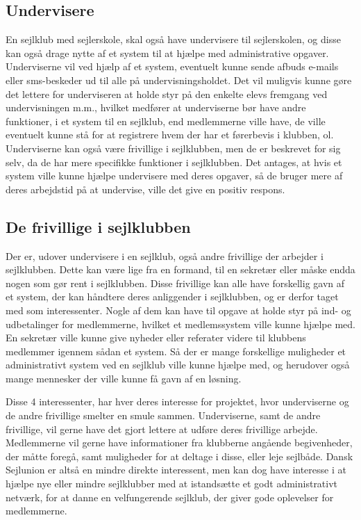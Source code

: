 \subsection{Undervisere}

En sejlklub med sejlerskole, skal også have undervisere til sejlerskolen, og disse kan også drage nytte af et system til
at hjælpe med administrative opgaver. Underviserne vil ved hjælp af et system, eventuelt kunne sende afbuds e-mails eller sms-beskeder ud til alle på
undervisningsholdet. Det vil muligvis kunne gøre det lettere for underviseren at holde styr på den enkelte elevs fremgang
ved undervisningen m.m., hvilket medfører at underviserne bør have andre funktioner, i et system til en sejlklub, end medlemmerne
ville have, de ville eventuelt kunne stå for at registrere hvem der har et førerbevis i klubben, ol. Underviserne kan også
være frivillige i sejlklubben, men de er beskrevet for sig selv, da de har mere specifikke funktioner i sejlklubben. 
Det antages, at hvis et system ville kunne hjælpe undervisere med deres opgaver, så de bruger mere af deres arbejdstid på
at undervise, ville det give en positiv respons.

\subsection{De frivillige i sejlklubben}

Der er, udover undervisere i en sejlklub, også andre frivillige der arbejder i sejlklubben. Dette kan være lige fra en
formand, til en sekretær eller måske endda nogen som gør rent i sejlklubben. Disse frivillige kan alle have forskellig
gavn af et system, der kan håndtere deres anliggender i sejlklubben, og er derfor taget med som interessenter. Nogle af
dem kan have til opgave at holde styr på ind- og udbetalinger for medlemmerne, hvilket et medlemssystem ville kunne
hjælpe med. En sekretær ville kunne give nyheder eller referater videre til klubbens medlemmer igennem sådan et
system. Så der er mange forskellige muligheder et administrativt system ved en sejlklub ville kunne hjælpe med, og
herudover også mange mennesker der ville kunne få gavn af en løsning.


Disse 4 interessenter, har hver deres interesse for projektet, hvor underviserne og de andre frivillige smelter en smule
sammen. Underviserne, samt de andre frivillige, vil gerne have det gjort lettere at udføre deres frivillige arbejde.
Medlemmerne vil gerne have informationer fra klubberne angående begivenheder, der
måtte foregå, samt muligheder for at deltage i disse, eller leje sejlbåde.
Dansk Sejlunion er altså en mindre direkte interessent, men kan dog have interesse i at hjælpe nye eller mindre
sejlklubber med at istandsætte et godt administrativt netværk, for at danne en velfungerende sejlklub, 
der giver gode oplevelser for medlemmerne.

